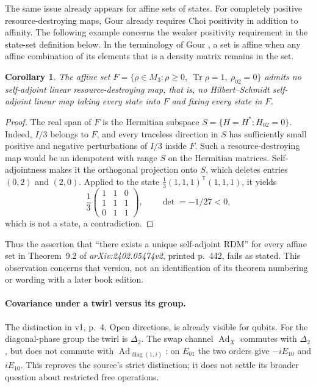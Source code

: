\documentclass[11pt]{article}
\newtheorem{corollary}[theorem]{Corollary}
\newcommand{\Ad}{\operatorname{Ad}}
\newcommand{\Tr}{\operatorname{Tr}}
\begin{document}
The same issue already appears for affine sets of states.
For completely positive resource-destroying maps, Gour
\cite[Appendix~F, Theorem~2]{Gour2017} already requires Choi positivity
in addition to affinity. The following example concerns the weaker
positivity requirement in the state-set definition below.
In the terminology of Gour \cite[Definition~9.7]{Gour}, a set is affine
when any affine combination of its elements that is a density matrix
remains in the set.
\begin{corollary}\label{cor:affine}
The affine set $F=\{\rho\in M_3:\rho\geq0,\ \Tr\rho=1,\ \rho_{02}=0\}$
admits no self-adjoint linear resource-destroying map, that is, no
Hilbert--Schmidt self-adjoint linear map taking every state into $F$
and fixing every state in $F$.
\end{corollary}
\begin{proof}
The real span of $F$ is the Hermitian subspace
$S=\{H=H^*:H_{02}=0\}$. Indeed, $I/3$ belongs to $F$, and every traceless
direction in $S$ has sufficiently small positive and negative perturbations
of $I/3$ inside $F$. Such a resource-destroying map would be an idempotent
with range $S$ on the Hermitian matrices. Self-adjointness makes it the
orthogonal projection onto $S$, which deletes entries $(0,2)$ and $(2,0)$.
Applied to the state $\frac13(1,1,1)^{\mathsf T}(1,1,1)$, it yields
\[
 \frac13\begin{pmatrix}1&1&0\\1&1&1\\0&1&1\end{pmatrix},
 \qquad\det=-1/27<0,
\]
which is not a state, a contradiction.
\end{proof}
Thus the assertion that ``there exists a unique self-adjoint RDM'' for
every affine set in Theorem~9.2 of \emph{arXiv:2402.05474v2},
printed p.~442, fails as stated.
This observation concerns that version, not an identification of its
theorem numbering or wording with a later book edition.

\paragraph{Covariance under a twirl versus its group.}
The distinction in v1, p.~4, Open directions, is already visible for
qubits. For the diagonal-phase group the twirl is $\Delta_2$.
The swap channel $\Ad_X$ commutes with $\Delta_2$, but does not commute
with $\Ad_{\operatorname{diag}(1,i)}$: on $E_{01}$ the two orders give
$-iE_{10}$ and $iE_{10}$. This reproves the source's strict distinction;
it does not settle its broader question about restricted free operations.
\end{document}
